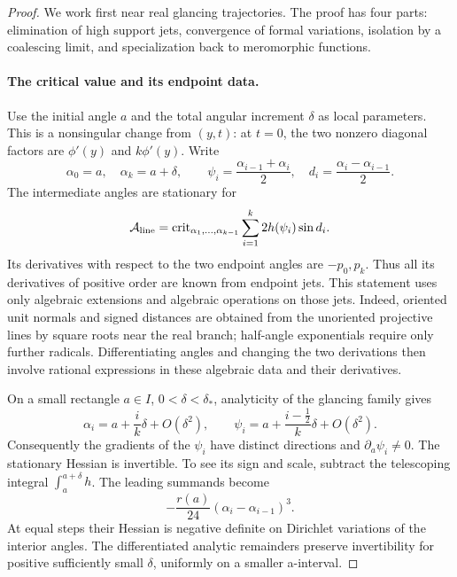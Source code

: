 \begin{proof}
We work first near real glancing trajectories.  The proof has
four parts: elimination of high support jets, convergence of
formal variations, isolation by a coalescing limit, and
specialization back to meromorphic functions.

\paragraph{The critical value and its endpoint data.}
Use the initial angle \(a\) and the total angular increment
\(\delta\) as local parameters.  This is a nonsingular change
from \((y,t)\): at \(t=0\), the two nonzero diagonal factors
are \(\phi'(y)\) and \(k\phi'(y)\).  Write
\[
 \alpha_0=a,\quad \alpha_k=a+\delta,\qquad
 \psi_i=\frac{\alpha_{i-1}+\alpha_i}{2},\quad
 d_i=\frac{\alpha_i-\alpha_{i-1}}2.
 \]
The intermediate angles are stationary for
\begin{equation}
 \mathcal A_{\rm line}
 =\operatorname{crit}_{\alpha_1,\ldots,\alpha_{k-1}}
 \sum_{i=1}^k2h(\psi_i)\sin d_i.
 \label{cont:line-critical-value}
\end{equation}
Its derivatives with respect to the two endpoint angles are
\(-p_0,p_k\).  Thus all its derivatives of positive order are
known from endpoint jets.  This statement uses only algebraic
extensions and algebraic operations on those jets.
Indeed, oriented unit normals and signed distances are
obtained from the unoriented projective lines by square
roots near the real branch; half-angle exponentials require
only further radicals.  Differentiating angles and changing
the two derivations then involve rational expressions in
these algebraic data and their derivatives.

On a small rectangle \(a\in I\), \(0<\delta<\delta_*\),
analyticity of the glancing family gives
\begin{equation}
 \alpha_i=a+\frac{i}{k}\delta+O(\delta^2),\qquad
 \psi_i=a+\frac{i-\tfrac12}{k}\delta+O(\delta^2).
 \label{cont:line-coalescence}
\end{equation}
Consequently the gradients of the \(\psi_i\) have distinct
directions and \(\partial_a\psi_i\ne0\).  The stationary
Hessian is invertible.  To see its sign and scale, subtract
the telescoping integral \(\int_a^{a+\delta}h\).
The leading summands become
\[
 -\frac{r(a)}{24}(\alpha_i-\alpha_{i-1})^3.
 \]
At equal steps their Hessian is negative definite on
Dirichlet variations of the interior angles.  The
differentiated analytic remainders preserve invertibility
for positive sufficiently small \(\delta\), uniformly on
a smaller a-interval.


\end{proof}
